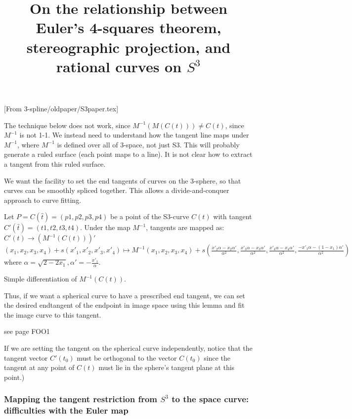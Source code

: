 \documentclass[12pt]{article}
\begin{document}
\subsubsection{}

[From 3-spline/oldpaper/S3paper.tex]

The technique below does not work, since $M^{-1}(M(C(t))) \neq C(t)$, 
since $M^{-1}$ is not 1-1.
We instead need to understand how the tangent line maps under $M^{-1}$,
where $M^{-1}$ is defined over all of 3-space, not just S3.
This will probably generate a ruled surface (each point maps to a line).
It is not clear how to extract a tangent from this ruled surface.

\title{On the relationship between Euler's 4-squares theorem, 
	stereographic projection, and rational curves on $S^3$}

We want the facility to set the end tangents of curves on the 3-sphere,
so that curves can be smoothly spliced together.
This allows a divide-and-conquer approach to curve fitting.

\begin{lemma}
Let $P=C(\hat{t})=(p1,p2,p3,p4)$ be a point of the S3-curve $C(t)$ 
with tangent $C'(\hat{t}) = (t1,t2,t3,t4)$.
Under the map $M^{-1}$, tangents are mapped as:
	$C'(t)  \rightarrow (M^{-1}(C(t)))'$ \\
	$(x_1,x_2,x_3,x_4) + s(x'_1,x'_2,x'_3,x'_4) \mapsto 
	 M^{-1}(x_1,x_2,x_3,x_4) 
      + s(\frac{x'_2 \alpha - x_2 \alpha'}{\alpha^2},
	  \frac{x'_3 \alpha - x_3 \alpha'}{\alpha^2},
	  \frac{x'_4 \alpha - x_4 \alpha'}{\alpha^2},
	  \frac{-x'_1 \alpha - (1-x_1)\alpha'}{\alpha^2})$
where $\alpha = \sqrt{2 - 2x_1}, \alpha' = -\frac{x'_1}{\alpha}$.
\end{lemma}
\prf
Simple differentiation of $M^{-1}(C(t))$.
\QED

Thus, if we want a spherical curve to have a prescribed end tangent,
we can set the desired endtangent of the endpoint in image space
using this lemma and fit the image curve to this tangent.

see page FOO1

If we are setting the tangent on the spherical curve independently, 
notice that the tangent vector $C'(t_0)$ must be orthogonal to the vector $C(t_0)$
since the tangent at any point of $C(t)$ must lie in the sphere's tangent plane
at this point.)


\clearpage

\subsubsection{Mapping the tangent restriction from $S^3$ to the space curve:
         difficulties with the Euler map}
\end{document}
